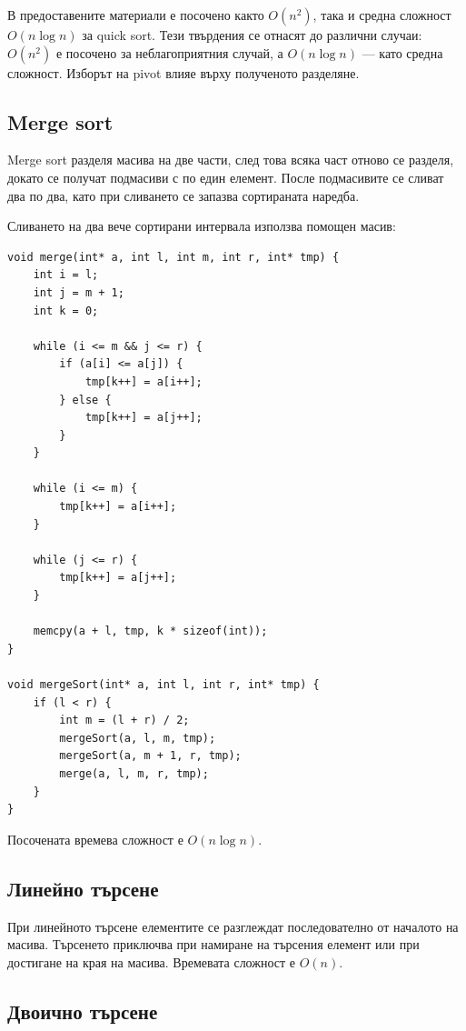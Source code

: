 \begin{supp}[Бележка]
В предоставените материали е посочено както $O(n^2)$, така и средна сложност $O(n\log n)$ за quick sort. Тези твърдения се отнасят до различни случаи: $O(n^2)$ е посочено за неблагоприятния случай, а $O(n\log n)$ --- като средна сложност. Изборът на pivot влияе върху полученото разделяне.
\end{supp}

\subsection{Merge sort}\label{s:15.5.5}

Merge sort разделя масива на две части, след това всяка част отново се разделя, докато се получат подмасиви с по един елемент. После подмасивите се сливат два по два, като при сливането се запазва сортираната наредба.

Сливането на два вече сортирани интервала използва помощен масив:

\begin{verbatim}
void merge(int* a, int l, int m, int r, int* tmp) {
    int i = l;
    int j = m + 1;
    int k = 0;

    while (i <= m && j <= r) {
        if (a[i] <= a[j]) {
            tmp[k++] = a[i++];
        } else {
            tmp[k++] = a[j++];
        }
    }

    while (i <= m) {
        tmp[k++] = a[i++];
    }

    while (j <= r) {
        tmp[k++] = a[j++];
    }

    memcpy(a + l, tmp, k * sizeof(int));
}

void mergeSort(int* a, int l, int r, int* tmp) {
    if (l < r) {
        int m = (l + r) / 2;
        mergeSort(a, l, m, tmp);
        mergeSort(a, m + 1, r, tmp);
        merge(a, l, m, r, tmp);
    }
}
\end{verbatim}

Посочената времева сложност е $O(n\log n)$.

\subsection{Линейно търсене}\label{s:15.5.6}

При линейното търсене елементите се разглеждат последователно от началото на масива. Търсенето приключва при намиране на търсения елемент или при достигане на края на масива. Времевата сложност е $O(n)$.

\subsection{Двоично търсене}\label{s:15.5.7}

